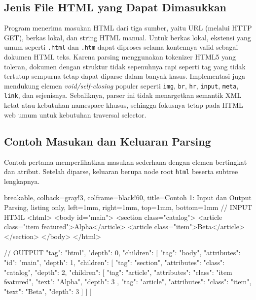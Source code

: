 \subsection{Jenis File HTML yang Dapat Dimasukkan}

Program menerima masukan HTML dari tiga sumber, yaitu URL (melalui HTTP GET), berkas lokal, dan string HTML manual. Untuk berkas lokal, ekstensi yang umum seperti \texttt{.html} dan \texttt{.htm} dapat diproses selama kontennya valid sebagai dokumen HTML teks. Karena parsing menggunakan tokenizer HTML5 yang toleran, dokumen dengan struktur tidak sepenuhnya rapi seperti tag yang tidak tertutup sempurna tetap dapat diparse dalam banyak kasus. Implementasi juga mendukung elemen \textit{void/self-closing} populer seperti \texttt{img}, \texttt{br}, \texttt{hr}, \texttt{input}, \texttt{meta}, \texttt{link}, dan sejenisnya. Sebaliknya, parser ini tidak menargetkan semantik XML ketat atau kebutuhan namespace khusus, sehingga fokusnya tetap pada HTML web umum untuk kebutuhan traversal selector.

\subsection{Contoh Masukan dan Keluaran Parsing}

Contoh pertama memperlihatkan masukan sederhana dengan elemen bertingkat dan atribut. Setelah diparse, keluaran berupa node root \texttt{html} beserta subtree lengkapnya.

\begin{tcblisting}{
        breakable,
        colback=gray!3,
        colframe=black!60,
        title=Contoh 1: Input dan Output Parsing,
        listing only,
        left=1mm,
        right=1mm,
        top=1mm,
        bottom=1mm
    }
    // INPUT HTML
    <html>
    <body id="main">
    <section class="catalog">
    <article class="item featured">Alpha</article>
    <article class="item">Beta</article>
    </section>
    </body>
    </html>


    // OUTPUT
    {
    "tag": "html",
    "depth": 0,
    "children": [
    {
    "tag": "body",
    "attributes": {"id": "main"},
    "depth": 1,
    "children": [
    {
    "tag": "section",
    "attributes": {"class": "catalog"},
    "depth": 2,
    "children": [
    {
    "tag": "article",
    "attributes": {"class": "item featured"},
    "text": "Alpha",
    "depth": 3
    },
    {
    "tag": "article",
    "attributes": {"class": "item"},
    "text": "Beta",
    "depth": 3
    }
    ]
    }
    ]
    }
    ]
    }
\end{tcblisting}

